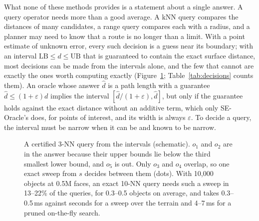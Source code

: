 \documentclass[sigconf,nonacm,screen]{acmart}
\newcommand{\LB}{\mathrm{LB}}
\newcommand{\UB}{\mathrm{UB}}
\newcommand{\eps}{\varepsilon}
\begin{document}
What none of these methods provides is a statement about a single answer. A query operator needs more than a good
average. A kNN query compares the distances of many candidates, a range query compares each with a radius, and a
planner may need to know that a route is no longer than a limit. With a point estimate of unknown error, every such
decision is a guess near its boundary; with an interval $\LB\le d\le\UB$ that is guaranteed to contain the exact
surface distance, most decisions can be made from the intervals alone, and the few that cannot are exactly the ones
worth computing exactly (Figure~\ref{fig:knn}; Table~\ref{tab:decisions} counts them). An oracle whose answer $\hat d$ is a path length with a guarantee
$\hat d\le(1+\eps)d$ implies the interval $[\hat d/(1+\eps),\hat d]$, but only if the guarantee holds against the
exact distance without an additive term, which only SE-Oracle's does, for points of interest, and its width is
always $\eps$. To decide a query, the
interval must be narrow when it can be and known to be narrow.

\begin{figure}[t]
\centering
{}
\caption{A certified 3-NN query from the intervals (schematic). $o_1$ and $o_2$ are in the answer because their
upper bounds lie below the third smallest lower bound, and $o_5$ is out. Only $o_3$ and $o_4$ overlap, so one exact
sweep from $s$ decides between them (dots). With 10,000 objects at 0.5M faces, an exact 10-NN query needs such a
sweep in 13--22\% of the queries, for 0.3--0.5 objects on average, and takes 0.3--0.5\,ms against seconds for a sweep
over the terrain and 4--7\,ms for a pruned on-the-fly search.}
\label{fig:knn}
\end{figure}
\end{document}
